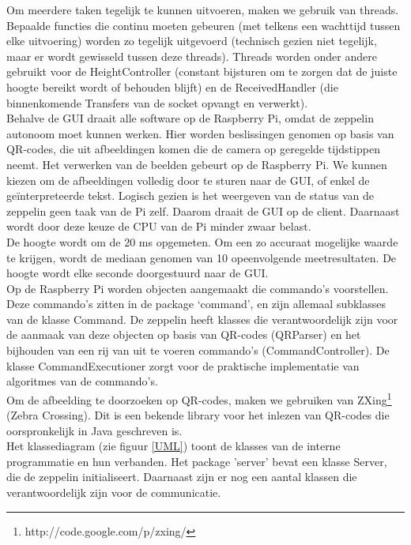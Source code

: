 \documentclass[eind]{penoverslag}
\begin{document}
Om meerdere taken tegelijk te kunnen uitvoeren, maken we gebruik van threads. Bepaalde functies die continu moeten gebeuren (met telkens een wachttijd tussen elke uitvoering) worden zo tegelijk uitgevoerd (technisch gezien niet tegelijk, maar er wordt gewisseld tussen deze threads). Threads worden onder andere gebruikt voor de HeightController (constant bijsturen om te zorgen dat de juiste hoogte bereikt wordt of behouden blijft) en de ReceivedHandler (die binnenkomende Transfers van de socket opvangt en verwerkt). \\

Behalve de GUI draait alle software op de Raspberry Pi, omdat de zeppelin autonoom moet kunnen werken. Hier worden beslissingen genomen op basis van QR-codes, die uit afbeeldingen komen die de camera op geregelde tijdstippen neemt. Het verwerken van de beelden gebeurt op de Raspberry Pi. We kunnen kiezen om de afbeeldingen volledig door te sturen naar de GUI, of enkel de ge\"interpreteerde tekst. Logisch gezien is het weergeven van de status van de zeppelin geen taak van de Pi zelf. Daarom draait de GUI op de client. Daarnaast wordt door deze keuze de CPU van de Pi minder zwaar belast. \\

De hoogte wordt om de 20 ms opgemeten. Om een zo accuraat mogelijke waarde te krijgen, wordt de mediaan genomen van 10 opeenvolgende meetresultaten. De hoogte wordt elke seconde doorgestuurd naar de GUI. \\

Op de Raspberry Pi worden objecten aangemaakt die commando's voorstellen. Deze commando's zitten in de package `command', en zijn allemaal subklasses van de klasse Command. De zeppelin heeft klasses die verantwoordelijk zijn voor de aanmaak van deze objecten op basis van QR-codes (QRParser) en het bijhouden van een rij van uit te voeren commando's (CommandController). De klasse CommandExecutioner zorgt voor de praktische implementatie van algoritmes van de commando's. \\

Om de afbeelding te doorzoeken op QR-codes, maken we gebruiken van ZXing\footnote{http://code.google.com/p/zxing/} (Zebra Crossing). Dit is een bekende library voor het inlezen van QR-codes die oorspronkelijk in Java geschreven is. \\

Het klassediagram (zie figuur \ref{UML}) toont de klasses van de interne programmatie en hun verbanden. Het package 'server' bevat een klasse Server, die de zeppelin initialiseert. Daarnaast zijn er nog een aantal klassen die verantwoordelijk zijn voor de communicatie.
\end{document}
